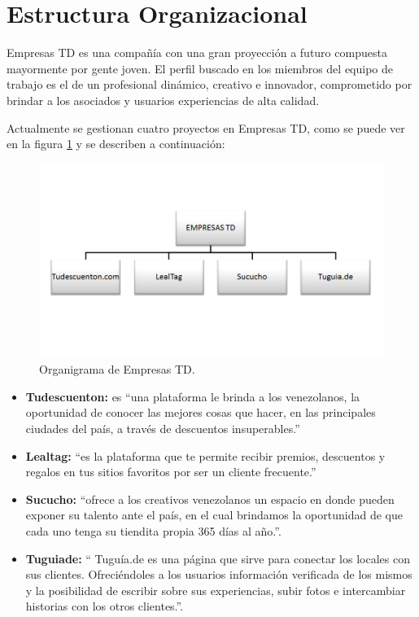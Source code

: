 \section{Estructura Organizacional} \label{sect:Estructura_organizacional}

Empresas TD es una compañía con una gran proyección a futuro compuesta mayormente 
por gente joven. El perfil buscado en los miembros del equipo de trabajo es el de 
un profesional dinámico, creativo e innovador, comprometido por brindar a los
asociados y usuarios experiencias de alta calidad. 

Actualmente se gestionan cuatro proyectos en Empresas TD, como se puede ver en la figura \ref{fig:ogtd} y se describen a continuación:

\begin{figure}[h]
	\begin{center}
		\includegraphics[scale=0.4]{imagenes/OrganigramaTD.png}
	\end{center}
	\caption{
		\label{fig:ogtd}
		Organigrama de Empresas TD.
	}
\end{figure}



\begin{itemize}
  \item \textbf{Tudescuenton:} es ``una plataforma le brinda a los venezolanos, la oportunidad de conocer las mejores cosas que hacer, en las principales ciudades del país, a través de descuentos insuperables.'' \cite{TDC}
  \item \textbf{Lealtag:} ``es la plataforma que te permite recibir premios, descuentos y regalos en tus sitios favoritos por ser un cliente frecuente.''\cite{LTG}
  \item \textbf{Sucucho:} ``ofrece a los creativos venezolanos un espacio en donde pueden exponer su talento ante el país, en el cual brindamos la oportunidad de que cada uno tenga su tiendita propia 365 días al año.''\cite{SCC}.
  \item \textbf{Tuguiade:} `` Tuguía.de es una página que sirve para conectar los locales con sus clientes. Ofreciéndoles a los usuarios información verificada de los mismos y la posibilidad de escribir sobre sus experiencias, subir fotos e intercambiar historias con los otros clientes.''\cite{TGD}. 
\end{itemize}
  

